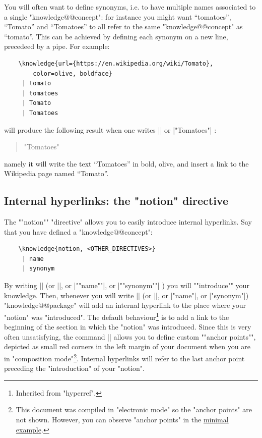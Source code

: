 \documentclass{article}
\begin{document}
You will often want to define synonyms, i.e. to have multiple names associated to a single "knowledge@@concept": for instance you might want ``tomatoes'', ``Tomato'' and  ``Tomatoes'' to all refer to the same "knowledge@@concept" as ``tomato''. This can be achieved by defining each synonym on a new line, precedeed by a pipe. For example:
\begin{verbatim}
    \knowledge{url={https://en.wikipedia.org/wiki/Tomato},
        color=olive, boldface}
     | tomato
     | tomatoes
     | Tomato
     | Tomatoes
\end{verbatim}
will produce the following result when one writes \spverb|| or
%
\spverb|"Tomatoes"|%
:%
\begin{quote}
    "Tomatoes"
\end{quote}
namely it will write the text ``Tomatoes'' in bold, olive, and insert a link to the Wikipedia page named ``Tomato''.


\subsection{Internal hyperlinks: the "notion" directive}

The ""notion"" "directive" allows you to easily introduce internal hyperlinks.
Say that you have defined a "knowledge@@concept":
\begin{verbatim}
    \knowledge{notion, <OTHER_DIRECTIVES>}
     | name
     | synonym
\end{verbatim}
By writing \spverb|| (or
\spverb||, or 
%
\spverb|""name""|, or \spverb|""synonym""|%
) you will \AP""introduce"" your knowledge. Then, whenever you will write
\spverb|| (or
\spverb||, or 
%
\spverb|"name"|, or \spverb|"synonym"|)%
"knowledge@@package" will add an internal hyperlink to the place where
your "notion" was "introduced". The default behaviour\footnote{Inherited from
"hyperref".} is to add a link to the beginning of the section in which the "notion" was introduced. Since this is very often unsatisfying, the command
\spverb|\AP| allows you to define custom \AP""anchor points"", depicted as 
small red corners in the left margin of your document when you are in 
"composition mode"\footnote{This document was compiled in "electronic mode" so
the "anchor points" are not shown. However, you can observe "anchor points" in 
the \href{https://github.com/remimorvan/knowledge-examples/tree/main/minimal-example}{minimal example}.}. Internal hyperlinks will refer to the last 
anchor point preceding the "introduction" of your "notion".
\end{document}
